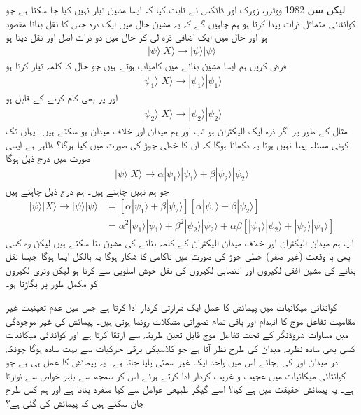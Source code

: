 لیکن سن \num{1982} ووٹرز، زورک اور ڈائکس نے ثابت کیا کہ ایسا مشین تیار نہیں کیا جا سکتا ہے جو کوانٹائی متماثل ذرات پیدا کرتا ہو ہم چاہیں گے کہ یہ مشین حال  میں ایک ذرہ جس کا نقل بنانا مقصود ہو اور حال  میں ایک اضافی ذرہ لی کر  حال  میں دو ذرات  اصل اور نقل دیتا ہو 
\begin{align}
	|\psi\rangle| X\rangle\to|\psi\rangle|\psi\rangle
\end{align}
فرض کریں ہم ایسا مشین بنانے میں کامیاب ہوتے ہیں جو حال  کا کلمہ تیار کرتا ہو 
\begin{align}
	|\psi_1\rangle| X\rangle\to|\psi_1\rangle|\psi_1\rangle
\end{align}
اور  پر بھی کام کرنے کے قابل ہو
\begin{align}
	|\psi_2\rangle| X\rangle\to|\psi_2\rangle|\psi_2\rangle
\end{align}
مثال کے طور پر اگر ذرہ ایک الیکٹران ہو تب  اور  ہم میدان اور خلاف میدان ہو سکتے ہیں۔ یہاں تک کوئی مسئلہ پیدا نہیں ہوتا یہ دکھانا ہوگا کہ ان کا خطی جوڑ  کی صورت میں کیا ہوگا؟ ظاہر ہے ایسی صورت میں درج ذیل ہوگا
\begin{align}
	|\psi\rangle| X\rangle\to\alpha|\psi_1\rangle|\psi_1\rangle+\beta|\psi_2\rangle|\psi_2\rangle
\end{align}
جو ہم نہیں چاہتے ہیں۔ ہم درج ذیل چاہتے ہیں  
\begin{align}
	|\psi\rangle| X\rangle\to|\psi\rangle|\psi\rangle &= [\alpha|\psi_1\rangle+\beta|\psi_2\rangle][\alpha|\psi_1\rangle+\beta|\psi_2\rangle]\nonumber \\
	&= \alpha^2|\psi_1\rangle|\psi_1\rangle+\beta^2|\psi_2\rangle|\psi_2\rangle+\alpha\beta[|\psi_1\rangle|\psi_2\rangle+|\psi_2\rangle|\psi_1\rangle]
\end{align}
آپ ہم میدان الیکٹران اور خلاف میدان الیکٹران کے کلمہ بنانے کی مشین بنا سکتے ہیں لیکن وہ کسی بھی با وقعت (غیر صفر)  خطی جوڑ کی صورت میں ناکامی کا شکار ہوگا یہ بالکل ایسا ہوگا جیسا نقل بنانے کی مشین  افقی لکیروں اور انتصابی لکیروں کی نقل خوش اسلوبی سے کرتا ہو لیکن وتری لکیروں کو مکمل طور پر بگاڑتا ہو۔

کوانٹائی میکانیات میں پیمائش کا عمل ایک شرارتی کردار ادا کرتا ہے جس میں عدم تعینیت غیر مقامیت تفاعل موج کا انہدام اور باقی تمام تصوراتی مشکلات رونما ہوتی ہیں۔ پیمائش کی غیر موجودگی میں مساوات شروڈنگر کے تحت تفاعل موج قابل تعین طریقہ سے ارتقا کرتا ہے اور کوانٹائی میکانیات کسی بھی سادہ نظریہ میدان کی طرح نظر آتا ہے جو کلاسیکی برقی حرکیات سے بہت سادہ ہوگا چونکہ دو میدان  اور  کی بجائے اس میں واحد ایک غیر سمتی  پایا جاتا ہے۔ یہ پیمائش کا عمل ہی ہے جو کوانٹائی میکانیات میں عجیب و غریب کردار ادا کرتے ہوئے اس کو سمجھ سے باہر خواص سے نوازتا ہے۔ یہ پیمائش حقیقت میں ہے کیا؟ اسے گیگر طبیعی عوامل سے کیا منفرد بناتا ہے اور ہم کس طرح جان سکتے ہیں کہ پیمائش کی گئی ہے؟

